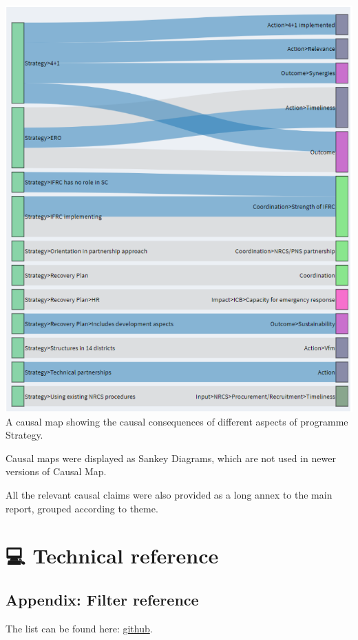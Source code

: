 \documentclass[
]{book}
\begin{document}
\includegraphics{_assets/19e34962dab6bd291d2b0de83a90478a.png}A causal map showing the causal consequences of different aspects of programme Strategy.

Causal maps were displayed as Sankey Diagrams, which are not used in newer versions of Causal Map.

All the relevant causal claims were also provided as a long annex to the main report, grouped according to theme.

\hypertarget{part-technical-reference}{%
\part{💻 Technical reference}\label{part-technical-reference}}

\hypertarget{appendix-filter-reference}{%
\chapter{Appendix: Filter reference}\label{appendix-filter-reference}}

The list can be found here: \href{https://stevepowell99.github.io/CausalMapFunctions/articles/examples.html}{github}.
\end{document}
